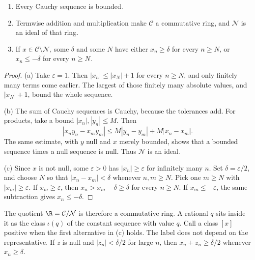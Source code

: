 \begin{lemma}\label{lem:cauchybasic}
\begin{enumerate}[label=(\alph*)]
\item Every Cauchy sequence is bounded.
\item Termwise addition and multiplication make $\mathcal C$ a commutative ring, and $\mathcal N$ is an ideal of that ring.
\item If $x\in\mathcal C\setminus\mathcal N$, some $\delta$ and some $N$ have either $x_n\ge\delta$ for every $n\ge N$, or $x_n\le-\delta$ for every $n\ge N$.
\end{enumerate}
\end{lemma}
\begin{proof}
(a) Take $\varepsilon=1$. Then $|x_n|\le |x_N|+1$ for every $n\ge N$, and only finitely many terms come earlier. The largest of those finitely many absolute values, and $|x_N|+1$, bound the whole sequence.

(b) The sum of Cauchy sequences is Cauchy, because the tolerances add. For products, take a bound $|x_n|,|y_n|\le M$. Then
\[
|x_ny_n-x_my_m|\le M|y_n-y_m|+M|x_n-x_m|.
\]
The same estimate, with $y$ null and $x$ merely bounded, shows that a bounded sequence times a null sequence is null. Thus $\mathcal N$ is an ideal.

(c) Since $x$ is not null, some $\varepsilon>0$ has $|x_n|\ge\varepsilon$ for infinitely many $n$. Set $\delta=\varepsilon/2$, and choose $N$ so that $|x_n-x_m|<\delta$ whenever $n,m\ge N$. Pick one $m\ge N$ with $|x_m|\ge\varepsilon$. If $x_m\ge\varepsilon$, then $x_n>x_m-\delta\ge\delta$ for every $n\ge N$. If $x_m\le-\varepsilon$, the same subtraction gives $x_n\le-\delta$.
\end{proof}

The quotient $\R=\mathcal C/\mathcal N$ is therefore a commutative ring. A rational $q$ sits inside it as the class $\iota(q)$ of the constant sequence with value $q$. Call a class $[x]$ positive when the first alternative in (c) holds. The label does not depend on the representative. If $z$ is null and $|z_n|<\delta/2$ for large $n$, then $x_n+z_n\ge\delta/2$ whenever $x_n\ge\delta$.

